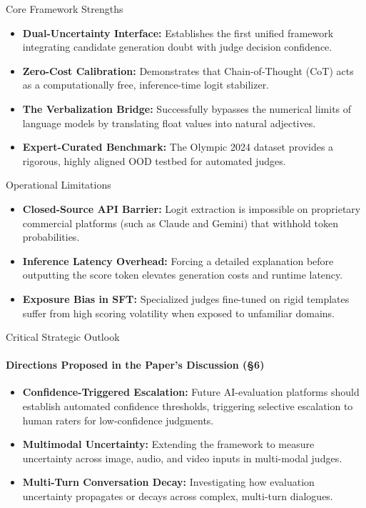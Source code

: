 \documentclass[10pt]{beamer}
\begin{document}
	\begin{frame}{Core Framework Strengths}
		\begin{itemize}
			\item \textbf{Dual-Uncertainty Interface:} Establishes the first unified framework integrating candidate generation doubt with judge decision confidence.
			\item \textbf{Zero-Cost Calibration:} Demonstrates that Chain-of-Thought (CoT) acts as a computationally free, inference-time logit stabilizer.
			\item \textbf{The Verbalization Bridge:} Successfully bypasses the numerical limits of language models by translating float values into natural adjectives.
			\item \textbf{Expert-Curated Benchmark:} The Olympic 2024 dataset provides a rigorous, highly aligned OOD testbed for automated judges.
		\end{itemize}
	\end{frame}
	
	\begin{frame}{Operational Limitations}
		\begin{itemize}
			\item \textbf{Closed-Source API Barrier:} Logit extraction is impossible on proprietary commercial platforms (such as Claude and Gemini) that withhold token probabilities.
			\item \textbf{Inference Latency Overhead:} Forcing a detailed explanation before outputting the score token elevates generation costs and runtime latency.
			\item \textbf{Exposure Bias in SFT:} Specialized judges fine-tuned on rigid templates suffer from high scoring volatility when exposed to unfamiliar domains.
		\end{itemize}
	\end{frame}
	
	\begin{frame}{Critical Strategic Outlook}
		\framesubtitle{Directions Proposed in the Paper's Discussion (\S6)}
		\begin{itemize}
			\item \textbf{Confidence-Triggered Escalation:} Future AI-evaluation platforms should establish automated confidence thresholds, triggering selective escalation to human raters for low-confidence judgments.
			\item \textbf{Multimodal Uncertainty:} Extending the framework to measure uncertainty across image, audio, and video inputs in multi-modal judges.
			\item \textbf{Multi-Turn Conversation Decay:} Investigating how evaluation uncertainty propagates or decays across complex, multi-turn dialogues.
		\end{itemize}
	\end{frame}
	
\end{document}
